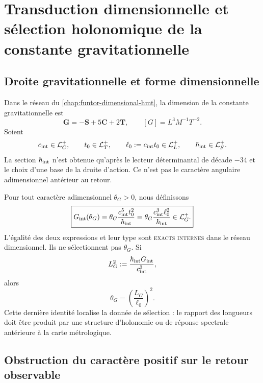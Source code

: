 
\chapter{Transduction dimensionnelle et sélection holonomique de la constante
gravitationnelle}
\label{chap:transductor-gravitatorio-G}

\section{Droite gravitationnelle et forme dimensionnelle}
\label{sec:recta-gravitatoria-interna}

Dans le réseau du \cref{chap:funtor-dimensional-hmt}, la dimension de la
constante gravitationnelle est
\[
 \mathbf G=-\mathbf S+5\mathbf C+2\mathbf T,
 \qquad
 [G]=L^3M^{-1}T^{-2}.
\]
Soient
\[
 c_{\rm int}\in\mathcal L_C^+,\qquad
 t_0\in\mathcal L_T^+,\qquad
 \ell_0:=c_{\rm int}t_0\in\mathcal L_L^+,
 \qquad
 \hbar_{\rm int}\in\mathcal L_S^+.
\]
La section \(\hbar_{\rm int}\) n'est obtenue qu'après le lecteur
déterminantal de décade \(-34\) et le choix d'une base de la droite
d'action. Ce n'est pas le caractère angulaire adimensionnel antérieur au retour.

Pour tout caractère adimensionnel \(\theta_G>0\), nous définissons
\[
 \boxed{
 G_{\rm int}(\theta_G)
 =\theta_G
 \frac{c_{\rm int}^{5}t_0^2}{\hbar_{\rm int}}
 =\theta_G
 \frac{c_{\rm int}^{3}\ell_0^2}{\hbar_{\rm int}}
 \in\mathcal L_G^+.}
\]
L'égalité des deux expressions et leur type sont
\textsc{exacts internes} dans le réseau dimensionnel. Ils ne sélectionnent pas
\(\theta_G\). Si
\[
 L_G^2:=\frac{\hbar_{\rm int}G_{\rm int}}{c_{\rm int}^3},
\]
alors
\[
 \theta_G=\left(\frac{L_G}{\ell_0}\right)^2.
\]
Cette dernière identité localise la donnée de sélection : le rapport des longueurs doit
être produit par une structure d'holonomie ou de réponse spectrale
antérieure à la carte métrologique.

\section{Obstruction du caractère positif sur le retour observable}
\label{sec:selector-holonomia-G}

